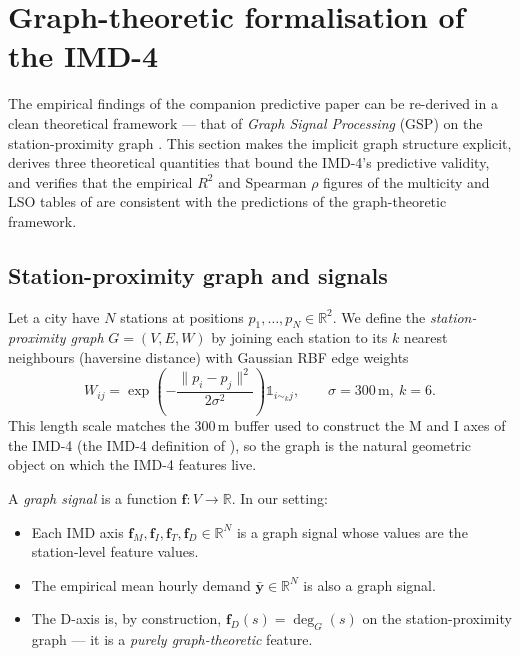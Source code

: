\section{Graph-theoretic formalisation of the IMD-4}
\label{sec:gsp}

The empirical findings of the companion predictive paper
\citep{Fosse2026imd_national} can be re-derived in a clean
theoretical framework — that of \emph{Graph Signal Processing}
(GSP) on the station-proximity graph
\citep{Shuman2013,SandryhailaMoura2014}.  This section makes the
implicit graph structure explicit, derives three theoretical
quantities that bound the IMD-4's predictive validity, and
verifies that the empirical $R^2$ and Spearman $\rho$ figures of
the multicity and LSO tables of \citet{Fosse2026imd_national}
are consistent with the predictions of the graph-theoretic
framework.

\subsection{Station-proximity graph and signals}

Let a city have $N$ stations at positions $p_1, \dots, p_N \in
\mathbb{R}^2$.  We define the \emph{station-proximity graph}
$G = (V, E, W)$ by joining each station to its $k$ nearest
neighbours (haversine distance) with Gaussian RBF edge weights
\begin{equation}
    W_{ij} = \exp\!\left(-\frac{\|p_i - p_j\|^2}{2\sigma^2}\right) \mathbb{1}_{i \sim_k j},
    \qquad \sigma = 300\,\mathrm{m},\ k = 6.
    \label{eq:graph-weights}
\end{equation}
This length scale matches the $300$\,m buffer used to construct
the M and I axes of the IMD-4
(the IMD-4 definition of \citet{Fosse2026imd_national}), so the graph is the natural geometric
object on which the IMD-4 features live.

A \emph{graph signal} is a function $\mathbf{f} : V \to \mathbb{R}$.
In our setting:
\begin{itemize}[label=$\bullet$,leftmargin=*]
\item Each IMD axis $\mathbf{f}_M, \mathbf{f}_I, \mathbf{f}_T,
      \mathbf{f}_D \in \mathbb{R}^N$ is a graph signal whose
      values are the station-level feature values.
\item The empirical mean hourly demand
      $\bar{\mathbf{y}} \in \mathbb{R}^N$ is also a graph signal.
\item The D-axis is, by construction,
      $\mathbf{f}_D(s) = \deg_G(s)$ on the station-proximity
      graph — it is a \emph{purely graph-theoretic} feature.
\end{itemize}

